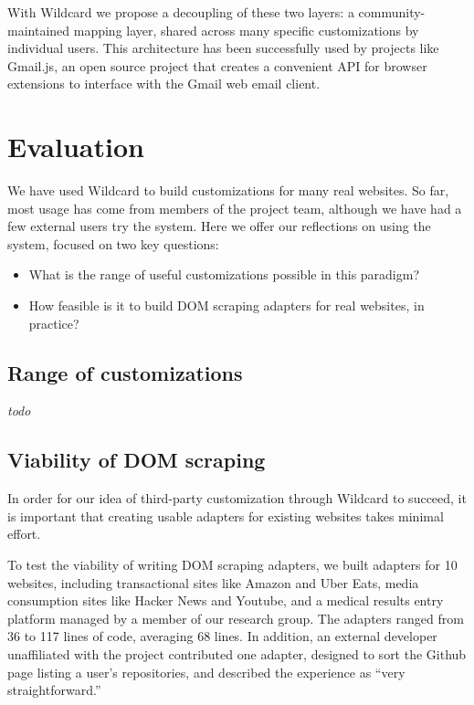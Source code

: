 \documentclass[sigplan,10pt,anonymous,review]{acmart}
\providecommand{\tightlist}{%
  \setlength{\itemsep}{0pt}\setlength{\parskip}{0pt}}
\begin{document}
With Wildcard we propose a decoupling of these two layers: a
community-maintained mapping layer, shared across many specific
customizations by individual users. This architecture has been
successfully used by projects like Gmail.js, an open source project that
creates a convenient API for browser extensions to interface with the
Gmail web email client.

\hypertarget{sec:evaluation}{%
\section{Evaluation}\label{sec:evaluation}}

We have used Wildcard to build customizations for many real websites. So
far, most usage has come from members of the project team, although we
have had a few external users try the system. Here we offer our
reflections on using the system, focused on two key questions:

\begin{itemize}
\tightlist
\item
  What is the range of useful customizations possible in this paradigm?
\item
  How feasible is it to build DOM scraping adapters for real websites,
  in practice?
\end{itemize}

\hypertarget{range-of-customizations}{%
\subsection{Range of customizations}\label{range-of-customizations}}

\emph{todo}

\hypertarget{viability-of-dom-scraping}{%
\subsection{Viability of DOM scraping}\label{viability-of-dom-scraping}}

In order for our idea of third-party customization through Wildcard to
succeed, it is important that creating usable adapters for existing
websites takes minimal effort.

To test the viability of writing DOM scraping adapters, we built
adapters for 10 websites, including transactional sites like Amazon and
Uber Eats, media consumption sites like Hacker News and Youtube, and a
medical results entry platform managed by a member of our research
group. The adapters ranged from 36 to 117 lines of code, averaging 68
lines. In addition, an external developer unaffiliated with the project
contributed one adapter, designed to sort the Github page listing a
user's repositories, and described the experience as ``very
straightforward.''
\end{document}
